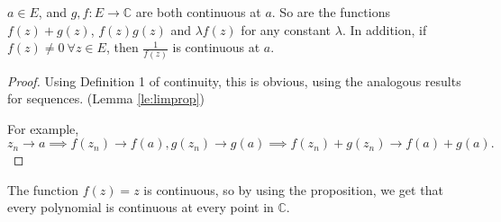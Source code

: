\begin{proposition}{}{}
    \label{contprop}
    \(a \in E\), and \(g, f: E \to \mathbb{C}\) are both continuous at \(a\). So are the functions \(f(z) + g(z)\), \(f(z)g(z)\) and \(\lambda f(z)\) for any constant \(\lambda\). In addition, if \(f(z)\neq 0~\forall z \in E\), then \(\frac{1}{f(z)}\) is continuous at \(a\).
\end{proposition}
\begin{proof}
    Using Definition 1 of continuity, this is obvious, using the analogous results for sequences. (Lemma \eqref{le:limprop})

    For example,
    \[z_n \to a \implies f(z_n) \to f(a), g(z_n) \to g(a) \implies f(z_n) + g(z_n) \to f(a) + g(a).\]
\end{proof}
The function \(f(z) = z\) is continuous, so by using the proposition, we get that every polynomial is continuous at every point in \(\mathbb{C}\).

